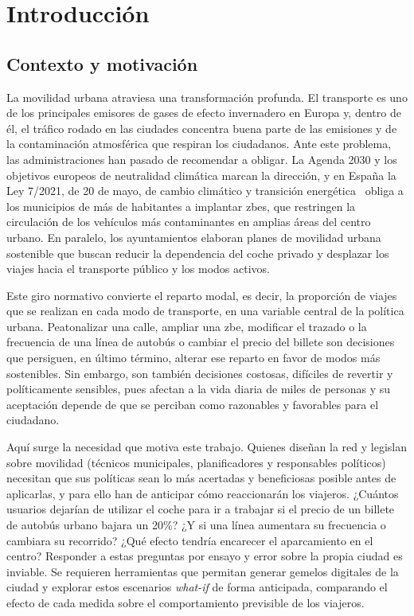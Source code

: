 \chapter{Introducción}

\section{Contexto y motivación}

La movilidad urbana atraviesa una transformación profunda. El transporte es uno de los principales emisores de gases de efecto invernadero en Europa y, dentro de él, el tráfico rodado en las ciudades concentra buena parte de las emisiones y de la contaminación atmosférica que respiran los ciudadanos. Ante este problema, las administraciones han pasado de recomendar a obligar. La Agenda 2030 y los objetivos europeos de neutralidad climática marcan la dirección, y en España la Ley 7/2021, de 20 de mayo, de cambio climático y transición energética~\cite{BOELey7_2021} obliga a los municipios de más de  habitantes a implantar \glspl{zbe}, que restringen la circulación de los vehículos más contaminantes en amplias áreas del centro urbano. En paralelo, los ayuntamientos elaboran planes de movilidad urbana sostenible que buscan reducir la dependencia del coche privado y desplazar los viajes hacia el transporte público y los modos activos.\newline

Este giro normativo convierte el reparto modal, es decir, la proporción de viajes que se realizan en cada modo de transporte, en una variable central de la política urbana. Peatonalizar una calle, ampliar una \gls{zbe}, modificar el trazado o la frecuencia de una línea de autobús o cambiar el precio del billete son decisiones que persiguen, en último término, alterar ese reparto en favor de modos más sostenibles. Sin embargo, son también decisiones costosas, difíciles de revertir y políticamente sensibles, pues afectan a la vida diaria de miles de personas y su aceptación depende de que se perciban como razonables y favorables para el ciudadano.\newline

Aquí surge la necesidad que motiva este trabajo. Quienes diseñan la red y legislan sobre movilidad (técnicos municipales, planificadores y responsables políticos) necesitan que sus políticas sean lo más acertadas y beneficiosas posible antes de aplicarlas, y para ello han de anticipar cómo reaccionarán los viajeros. ¿Cuántos usuarios dejarían de utilizar el coche para ir a trabajar si el precio de un billete de autobús urbano bajara un 20\%? ¿Y si una línea aumentara su frecuencia o cambiara su recorrido? ¿Qué efecto tendría encarecer el aparcamiento en el centro? Responder a estas preguntas por ensayo y error sobre la propia ciudad es inviable. Se requieren herramientas que permitan generar gemelos digitales de la ciudad y explorar estos escenarios \textit{what-if} de forma anticipada, comparando el efecto de cada medida sobre el comportamiento previsible de los viajeros.\newline

